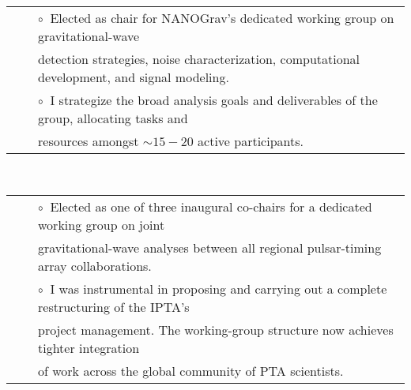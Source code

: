 \documentclass[11pt,letterpaper,sans]{moderncv}
\begin{document}
\begin{tabular}{rcl}
&\hspace{0.4cm} &{\color{color1} $\circ\;\;$}Elected as chair for NANOGrav's dedicated working group on gravitational-wave \\
&\hspace{0.4cm} &  \hspace{0.4cm}detection strategies, noise characterization, computational development, and signal modeling.\\
&\hspace{0.4cm} &  {\color{color1} $\circ\;\;$}I strategize the broad analysis goals and deliverables of the group, allocating tasks and\\ 
&\hspace{0.4cm} &  \hspace{0.4cm}resources amongst $\sim15-20$ active participants. 
\end{tabular} \\
\begin{tabular}{rcl}
&\hspace{0.4cm} &{\color{color1} $\circ\;\;$}Elected as one of three inaugural co-chairs for a dedicated working group on joint\\
&\hspace{0.4cm} &  \hspace{0.4cm}gravitational-wave analyses between all regional pulsar-timing array collaborations.\\
&\hspace{0.4cm} &  {\color{color1} $\circ\;\;$}I was instrumental in proposing and carrying out a complete restructuring of the IPTA's \\
&\hspace{0.4cm} &  \hspace{0.4cm}project management. The working-group structure now achieves tighter integration\\
&\hspace{0.4cm} &  \hspace{0.4cm}of work across the global community of PTA scientists. 
\end{tabular} \\
\end{document}
